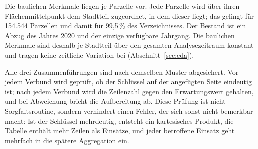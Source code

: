 Die baulichen Merkmale liegen je Parzelle vor. Jede Parzelle wird über ihren
Flächenmittelpunkt dem Stadtteil zugeordnet, in dem dieser liegt; das gelingt
für 154.544 Parzellen und damit für 99,5\,\% des Verzeichnisses. Der Bestand
ist ein Abzug des Jahres 2020 und der einzige verfügbare Jahrgang. Die
baulichen Merkmale sind deshalb je Stadtteil über den gesamten Analysezeitraum
konstant und tragen keine zeitliche Variation bei (Abschnitt~\ref{sec:eda}).

Alle drei Zusammenführungen sind nach demselben Muster abgesichert. Vor jedem
Verbund wird geprüft, ob der Schlüssel auf der angefügten Seite eindeutig ist;
nach jedem Verbund wird die Zeilenzahl gegen den Erwartungswert gehalten, und
bei Abweichung bricht die Aufbereitung ab. Diese Prüfung ist nicht
Sorgfaltsroutine, sondern verhindert einen Fehler, der sich sonst nicht
bemerkbar macht: Ist der Schlüssel mehrdeutig, entsteht ein kartesisches
Produkt, die Tabelle enthält mehr Zeilen als Einsätze, und jeder betroffene
Einsatz geht mehrfach in die spätere Aggregation ein.

